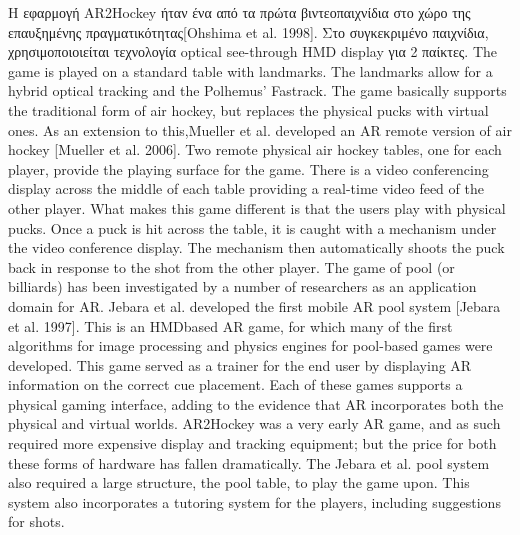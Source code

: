 Η εφαρμογή AR2Hockey ήταν ένα από τα πρώτα βιντεοπαιχνίδια στο χώρο της επαυξημένης πραγματικότητας[Ohshima et al. 1998]. Στο συγκεκριμένο παιχνίδια, χρησιμοποιοιείται τεχνολογία optical see-through HMD display για 2 παίκτες. The game is played on a standard table with landmarks. The landmarks allow for a hybrid optical tracking and the Polhemus’ Fastrack. The game basically supports the traditional form of air hockey, but replaces the physical pucks with virtual ones. As an extension to this,Mueller et al. developed an AR remote version of air hockey [Mueller et al. 2006]. Two remote physical air hockey tables, one for each player, provide the playing surface for the game. There is a video conferencing display across the middle of each table providing a real-time video feed of the other player. What makes this game different is that the users play with physical pucks. Once a puck is hit across the table, it is caught with a mechanism under the video conference display. The mechanism then automatically shoots the puck back in response to the shot from the other player. The game of pool (or billiards) has been investigated by a number of researchers as an application domain for AR. Jebara et al. developed the first mobile AR pool system [Jebara et al. 1997]. This is an HMDbased AR game, for which many of the first algorithms for image processing and physics engines for pool-based games were developed. This game served as a trainer for the end user by displaying AR information on the correct cue placement. Each of these games supports a physical gaming interface, adding to the evidence that AR incorporates both the physical and virtual worlds. AR2Hockey was a very early AR game, and as such required more expensive display and tracking equipment; but the price for both these forms of hardware has fallen dramatically. The Jebara et al. pool system also required a large structure, the pool table, to play the game upon. This system also incorporates a tutoring system for the players, including suggestions for shots.



